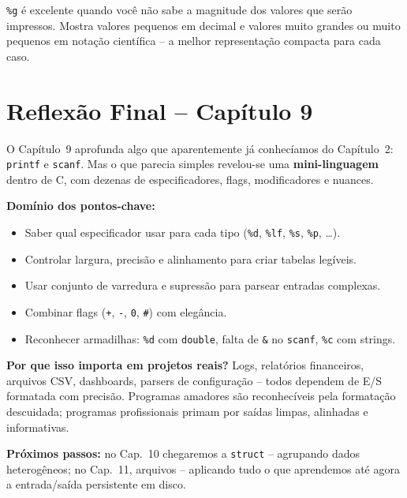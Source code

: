 \documentclass[12pt,a4paper]{article}
\begin{document}
\begin{respostabox}
\begin{boaprática}
  \texttt{\%g} é excelente quando você não sabe a magnitude dos valores que
  serão impressos. Mostra valores pequenos em decimal e valores muito grandes
  ou muito pequenos em notação científica -- a melhor representação compacta
  para cada caso.
\end{boaprática}
\end{respostabox}

\newpage

\section*{Reflexão Final -- Capítulo 9}

\begin{tcolorbox}[colback=deitellightblue,colframe=deitelblue,
  title={\bfseries A arte da E/S formatada}]

O Capítulo~9 aprofunda algo que aparentemente já conhecíamos do Capítulo~2:
\texttt{printf} e \texttt{scanf}. Mas o que parecia simples revelou-se uma
\textbf{mini-linguagem} dentro de C, com dezenas de especificadores, flags,
modificadores e nuances.

\textbf{Domínio dos pontos-chave:}
\begin{itemize}[noitemsep]
  \item Saber qual especificador usar para cada tipo (\texttt{\%d}, \texttt{\%lf}, \texttt{\%s}, \texttt{\%p}, \ldots).
  \item Controlar largura, precisão e alinhamento para criar tabelas legíveis.
  \item Usar conjunto de varredura e supressão para parsear entradas complexas.
  \item Combinar flags (\texttt{+}, \texttt{-}, \texttt{0}, \texttt{\#}) com elegância.
  \item Reconhecer armadilhas: \texttt{\%d} com \texttt{double}, falta de \texttt{\&}
  no \texttt{scanf}, \texttt{\%c} com strings.
\end{itemize}

\textbf{Por que isso importa em projetos reais?} Logs, relatórios financeiros,
arquivos CSV, dashboards, parsers de configuração -- todos dependem de E/S formatada
com precisão. Programas amadores são reconhecíveis pela formatação descuidada;
programas profissionais primam por saídas limpas, alinhadas e informativas.

\textbf{Próximos passos:} no Cap.~10 chegaremos a \texttt{struct} -- agrupando
dados heterogêneos; no Cap.~11, arquivos -- aplicando tudo o que aprendemos
até agora a entrada/saída persistente em disco.

\end{tcolorbox}
\end{document}
